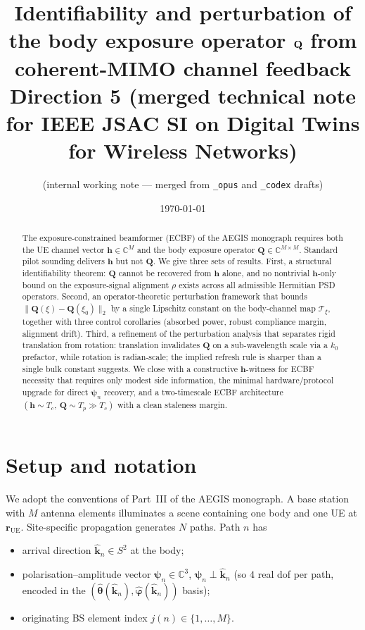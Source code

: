 \documentclass[11pt,a4paper]{article}
\title{Identifiability and perturbation of the body exposure operator
       \texorpdfstring{$\Q$}{Q} from coherent-MIMO channel feedback\\
       \large Direction 5 (merged technical note for IEEE JSAC SI on
       Digital Twins for Wireless Networks)}
\author{(internal working note --- merged from \texttt{\_opus} and
        \texttt{\_codex} drafts)}
\date{\today}
\theoremstyle{definition}
\newcommand{\rr}{\mathbf{r}}
\newcommand{\hh}{\mathbf{h}}
\newcommand{\kh}{\hat{\mathbf{k}}}
\newcommand{\Q}{\mathbf{Q}}
\newcommand{\psib}{\boldsymbol{\psi}}
\newcommand{\C}{\mathbb{C}}
\newcommand{\Top}{\mathcal{T}}
\begin{document}
\maketitle

\begin{abstract}
The exposure-constrained beamformer (ECBF) of the AEGIS monograph
requires both the UE channel vector $\hh\in\C^M$ and the body exposure
operator $\Q\in\C^{M\times M}$. Standard pilot sounding delivers $\hh$
but not $\Q$. We give three sets of results. First, a structural
identifiability theorem: $\Q$ cannot be recovered from $\hh$ alone, and
no nontrivial $\hh$-only bound on the exposure-signal alignment $\rho$
exists across all admissible Hermitian PSD operators. Second, an
operator-theoretic perturbation framework that bounds $\|\Q(\xi)-\Q(\xi_0)\|_2$
by a single Lipschitz constant on the body-channel map $\Top_\xi$,
together with three control corollaries (absorbed power, robust
compliance margin, alignment drift). Third, a refinement of the
perturbation analysis that separates rigid translation from rotation:
translation invalidates $\Q$ on a sub-wavelength scale via a $k_0$
prefactor, while rotation is radian-scale; the implied refresh rule is
sharper than a single bulk constant suggests. We close with a
constructive $\hh$-witness for ECBF necessity that requires only modest
side information, the minimal hardware/protocol upgrade for direct
$\psib_n$ recovery, and a two-timescale ECBF architecture
$(\hh\!\sim\! T_c,\ \Q\!\sim\! T_p \gg T_c)$ with a clean staleness
margin.
\end{abstract}

\section{Setup and notation}
\label{sec:setup}

We adopt the conventions of Part~III of the AEGIS monograph.
A base station with $M$ antenna elements illuminates a scene containing
one body and one UE at $\rr_{\mathrm{UE}}$. Site-specific propagation
generates $N$ paths. Path $n$ has

\begin{itemize}[leftmargin=2em,itemsep=2pt]
\item arrival direction $\kh_n \in S^2$ at the body;
\item polarisation--amplitude vector $\psib_n \in \C^3$,
      $\psib_n \perp \kh_n$ (so $4$ real dof per path, encoded in the
      $(\hat{\boldsymbol\theta}(\kh_n),\hat{\boldsymbol\varphi}(\kh_n))$
      basis);
\item originating BS element index $j(n)\in\{1,\dots,M\}$.
\end{itemize}
\end{document}
